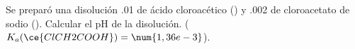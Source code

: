 Se preparó una disolución \SI{,01}{\Molar} de ácido cloroacético () y \SI{,002}{\Molar} de cloroacetato de sodio (). Calcular el pH de la disolución. ($K_a(\ce{ClCH2COOH}) = \num{1,36e-3}$).
